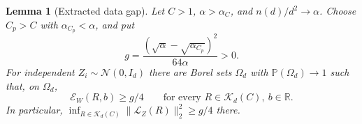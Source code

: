 \documentclass[11pt]{article}
\newcommand{\R}{\mathbb R}
\newcommand{\Pbb}{\mathbb P}
\newcommand{\norm}[1]{\lVert#1\rVert}
\newtheorem{lemma}[theorem]{Lemma}
\theoremstyle{remark}
\begin{document}
\begin{lemma}[Extracted data gap]\label{lem:data-gap}
Let $C>1$, $\alpha>\alpha_C$, and $n(d)/d^2\to\alpha$.
Choose $C_p>C$ with $\alpha_{C_p}<\alpha$, and put
\begin{equation}\label{eq:gap-constant}
 g=\frac{(\sqrt\alpha-\sqrt{\alpha_{C_p}})^2}{64\alpha}>0.
\end{equation}
For independent $Z_i\sim\mathcal N(0,I_d)$ there are Borel sets
$\Omega_d$ with $\Pbb(\Omega_d)\to1$ such that, on $\Omega_d$,
\begin{equation}\label{eq:data-gap}
 \mathcal E_W(R,b)\ge g/4
 \qquad\text{for every }R\in\mathcal K_d(C),\ b\in\R.
\end{equation}
In particular, $\inf_{R\in\mathcal K_d(C)}
\norm{\mathcal L_Z(R)}_2^2\ge g/4$ there.
\end{lemma}
\end{document}
